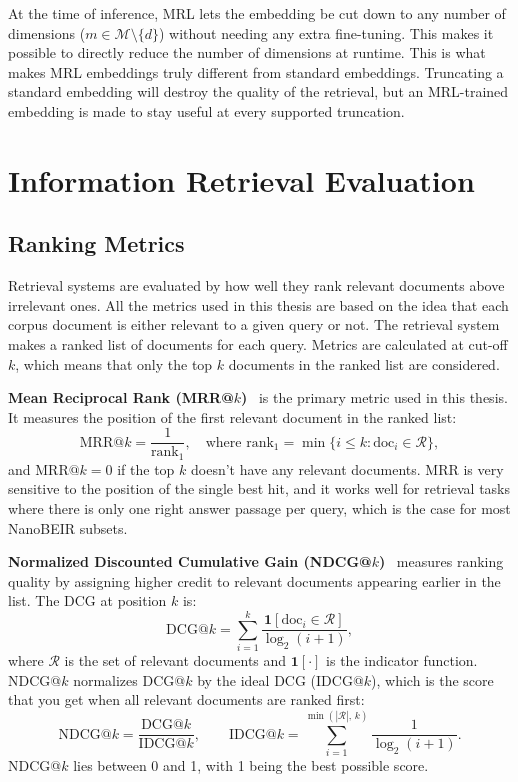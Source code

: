 At the time of inference, MRL lets the embedding be cut down to any number of dimensions ($m \in \mathcal{M} \setminus \{d\}$) without needing any extra fine-tuning. This makes it possible to directly reduce the number of dimensions at runtime. This is what makes MRL embeddings truly different from standard embeddings. Truncating a standard embedding will destroy the quality of the retrieval, but an MRL-trained embedding is made to stay useful at every supported truncation.

\section{Information Retrieval Evaluation}
\label{sec:ir_eval}

\subsection{Ranking Metrics}

Retrieval systems are evaluated by how well they rank relevant documents above irrelevant ones. All the metrics used in this thesis are based on the idea that each corpus document is either relevant to a given query or not. The retrieval system makes a ranked list of documents for each query. Metrics are calculated at cut-off $k$, which means that only the top $k$ documents in the ranked list are considered.

\textbf{Mean Reciprocal Rank (MRR@$k$)}~\cite{voorhees1999trec} is the primary metric used in this thesis. It measures the position of the first relevant document in the ranked list:
%
\begin{equation}
  \text{MRR}@k = \frac{1}{\text{rank}_1}, \quad
  \text{where } \text{rank}_1 = \min\{i \leq k : \text{doc}_i \in \mathcal{R}\},
  \label{eq:mrr}
\end{equation}
%
and $\text{MRR}@k = 0$ if the top $k$ doesn't have any relevant documents. MRR is very sensitive to the position of the single best hit, and it works well for retrieval tasks where there is only one right answer passage per query, which is the case for most NanoBEIR subsets.

\textbf{Normalized Discounted Cumulative Gain (NDCG@$k$)}~\cite{jarvelin2002cumulated} measures ranking quality by assigning higher credit to relevant documents appearing earlier in the list. The DCG at position $k$ is:
%
\begin{equation}
  \text{DCG}@k = \sum_{i=1}^{k} \frac{\mathbf{1}[\text{doc}_i \in \mathcal{R}]}{\log_2(i+1)},
  \label{eq:dcg}
\end{equation}
%
where $\mathcal{R}$ is the set of relevant documents and $\mathbf{1}[\cdot]$ is the indicator function. NDCG@$k$ normalizes DCG@$k$ by the ideal DCG (IDCG@$k$), which is the score that you get when all relevant documents are ranked first:
%
\begin{equation}
  \text{NDCG}@k = \frac{\text{DCG}@k}{\text{IDCG}@k}, \qquad
  \text{IDCG}@k = \sum_{i=1}^{\min(|\mathcal{R}|,\, k)} \frac{1}{\log_2(i+1)}.
  \label{eq:ndcg}
\end{equation}
%
NDCG@$k$ lies between 0 and 1, with 1 being the best possible score.


